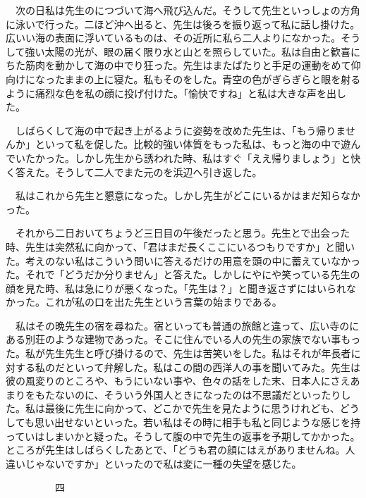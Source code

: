 \documentclass[a4j,onecolumn]{tarticle}
\begin{document}
　次の日私は先生のにつづいて海へ飛び込んだ。\hbox{}そうして先生といっしょの方角に泳いで行った。\hbox{}二ほど沖へ出ると、\hbox{}先生は後ろを振り返って私に話し掛けた。\hbox{}広いい海の表面に浮いているものは、\hbox{}その近所に私ら二人よりになかった。\hbox{}そうして強い太陽の光が、\hbox{}眼の届く限り水と山とを照らしていた。\hbox{}私は自由と歓喜にちた筋肉を動かして海の中でり狂った。\hbox{}先生はまたぱたりと手足の運動をめて仰向けになったままの上に寝た。\hbox{}私もそのをした。\hbox{}青空の色がぎらぎらと眼を射るように痛烈な色を私の顔に投げ付けた。\hbox{}「愉快ですね」と私は大きな声を出した。\hbox{}\par{}
　しばらくして海の中で起き上がるように姿勢を改めた先生は、\hbox{}「もう帰りませんか」といって私を促した。\hbox{}比較的強い体質をもった私は、\hbox{}もっと海の中で遊んでいたかった。\hbox{}しかし先生から誘われた時、\hbox{}私はすぐ「ええ帰りましょう」と快く答えた。\hbox{}そうして二人でまた元のを浜辺へ引き返した。\hbox{}\par{}
　私はこれから先生と懇意になった。\hbox{}しかし先生がどこにいるかはまだ知らなかった。\hbox{}\par{}
　それから二日おいてちょうど三日目の午後だったと思う。\hbox{}先生とで出会った時、\hbox{}先生は突然私に向かって、\hbox{}「君はまだ長くここにいるつもりですか」と聞いた。\hbox{}考えのない私はこういう問いに答えるだけの用意を頭の中に蓄えていなかった。\hbox{}それで「どうだか分りません」と答えた。\hbox{}しかしにやにや笑っている先生の顔を見た時、\hbox{}私は急にりが悪くなった。\hbox{}「先生は？」と聞き返さずにはいられなかった。\hbox{}これが私の口を出た先生という言葉の始まりである。\hbox{}\par{}
　私はその晩先生の宿を尋ねた。\hbox{}宿といっても普通の旅館と違って、\hbox{}広い寺のにある別荘のような建物であった。\hbox{}そこに住んでいる人の先生の家族でない事もった。\hbox{}私が先生先生と呼び掛けるので、\hbox{}先生は苦笑いをした。\hbox{}私はそれが年長者に対する私のだといって弁解した。\hbox{}私はこの間の西洋人の事を聞いてみた。\hbox{}先生は彼の風変りのところや、\hbox{}もうにいない事や、\hbox{}色々の話をした末、\hbox{}日本人にさえあまりをもたないのに、\hbox{}そういう外国人ときになったのは不思議だといったりした。\hbox{}私は最後に先生に向かって、\hbox{}どこかで先生を見たように思うけれども、\hbox{}どうしても思い出せないといった。\hbox{}若い私はその時に相手も私と同じような感じを持っていはしまいかと疑った。\hbox{}そうして腹の中で先生の返事を予期してかかった。\hbox{}ところが先生はしばらくしたあとで、\hbox{}「どうも君の顔にはえがありませんね。\hbox{}人違いじゃないですか」といったので私は変に一種の失望を感じた。\hbox{}\par{}\par{}　　　　　四
\end{document}
